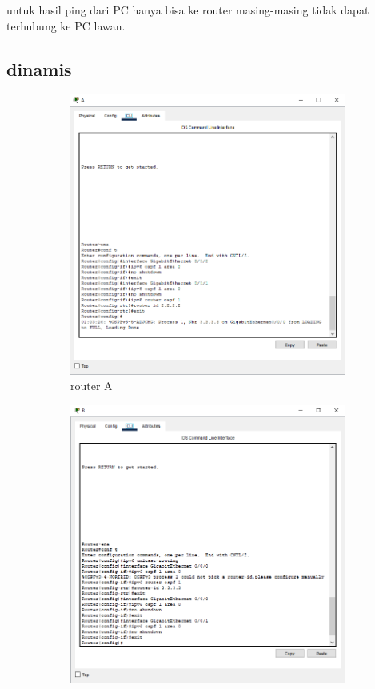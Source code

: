 untuk hasil ping dari PC hanya bisa ke router masing-masing tidak dapat terhubung ke PC lawan. 
\subsection{dinamis}
\begin{figure}[H]
    \centering
    \begin{subfigure}[b]{0.3\linewidth}
      \centering
      \includegraphics[width=\linewidth]{image/ospf1.png}
      \caption{router A}
    \end{subfigure}
    \hspace{1cm}
    \begin{subfigure}[b]{0.3\linewidth}
      \centering
      \includegraphics[width=\linewidth]{image/ospf2.png}

\end{subfigure}
\end{figure}
